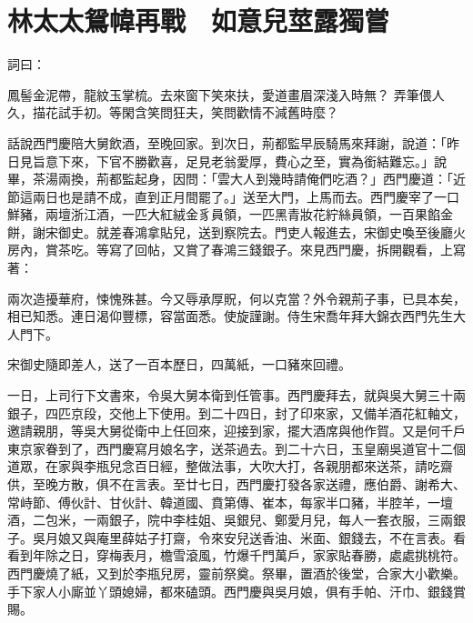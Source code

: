 %

\chapter{林太太鴛幃再戰　如意兒莖露獨嘗}

詞曰：

鳳髻金泥帶，龍紋玉掌梳。去來窗下笑來扶，愛道畫眉深淺入時無？
弄筆偎人久，描花試手初。等閑含笑問狂夫，笑問歡情不減舊時麼？

話說西門慶陪大舅飲酒，至晚回家。到次日，荊都監早辰騎馬來拜謝，說道：「昨日見旨意下來，下官不勝歡喜，足見老翁愛厚，費心之至，實為銜結難忘。」說畢，茶湯兩換，荊都監起身，因問：「雲大人到幾時請俺們吃酒？」西門慶道：「近節這兩日也是請不成，直到正月間罷了。」送至大門，上馬而去。西門慶宰了一口鮮豬，兩壇浙江酒，一匹大紅絨金豸員領，一匹黑青妝花紵絲員領，一百果餡金餅，謝宋御史。就差春鴻拿貼兒，送到察院去。門吏人報進去，宋御史喚至後廳火房內，賞茶吃。等寫了回帖，又賞了春鴻三錢銀子。來見西門慶，拆開觀看，上寫著：

兩次造擾華府，悚愧殊甚。今又辱承厚貺，何以克當？外令親荊子事，已具本矣，相已知悉。連日渴仰豐標，容當面悉。使旋謹謝。侍生宋喬年拜大錦衣西門先生大人門下。

宋御史隨即差人，送了一百本歷日，四萬紙，一口豬來回禮。

一日，上司行下文書來，令吳大舅本衛到任管事。西門慶拜去，就與吳大舅三十兩銀子，四匹京段，交他上下使用。到二十四日，封了印來家，又備羊酒花紅軸文，邀請親朋，等吳大舅從衛中上任回來，迎接到家，擺大酒席與他作賀。又是何千戶東京家眷到了，西門慶寫月娘名字，送茶過去。到二十六日，玉皇廟吳道官十二個道眾，在家與李瓶兒念百日經，整做法事，大吹大打，各親朋都來送茶，請吃齋供，至晚方散，俱不在言表。至廿七日，西門慶打發各家送禮，應伯爵、謝希大、常峙節、傅伙計、甘伙計、韓道國、賁第傳、崔本，每家半口豬，半腔羊，一壇酒，二包米，一兩銀子，院中李桂姐、吳銀兒、鄭愛月兒，每人一套衣服，三兩銀子。吳月娘又與庵里薛姑子打齋，令來安兒送香油、米面、銀錢去，不在言表。看看到年除之日，穿梅表月，檐雪滾風，竹爆千門萬戶，家家貼春勝，處處挑桃符。西門慶燒了紙，又到於李瓶兒房，靈前祭奠。祭畢，置酒於後堂，合家大小歡樂。手下家人小廝並丫頭媳婦，都來磕頭。西門慶與吳月娘，俱有手帕、汗巾、銀錢賞賜。

